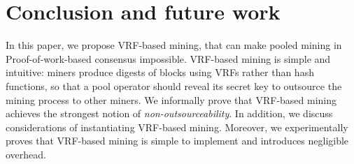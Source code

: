 \section{Conclusion and future work}
\label{sec:conclusion}

In this paper, we propose VRF-based mining, that can make pooled mining in Proof-of-work-based consensus impossible.
VRF-based mining is simple and intuitive: miners produce digests of blocks using VRFs rather than hash functions, so that a pool operator should reveal its secret key to outsource the mining process to other miners.
We informally prove that VRF-based mining achieves the strongest notion of \emph{non-outsourceability}.
In addition, we discuss considerations of instantiating VRF-based mining.
Moreover, we experimentally proves that VRF-based mining is simple to implement and introduces negligible overhead.